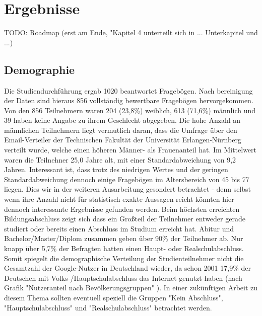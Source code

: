 %
% 

\chapter{Ergebnisse}

TODO: Roadmap (erst am Ende, "Kapitel 4 unterteilt sich in ... Unterkapitel und ...)

\section{Demographie}
Die Studiendurchführung ergab 1020 beantwortet Fragebögen. Nach bereinigung der Daten sind hieraus 856 vollständig bewertbare Fragebögen hervorgekommen.
Von den 856 Teilnehmern waren 204 (23,8\%) weiblich, 613 (71,6\%) männlich und 39 haben keine Angabe zu ihrem Geschlecht abgegeben. Die hohe Anzahl an männlichen Teilnehmern liegt vermutlich daran, dass die Umfrage über den Email-Verteiler der Technischen Fakultät der Universität Erlangen-Nürnberg verteilt wurde, welche einen höheren Männer- als Frauenanteil hat.
Im Mittelwert waren die Teilnehner 25,0 Jahre alt, mit einer Standardabweichung von 9,2 Jahren.
Interessant ist, dass trotz des niedrigen Wertes und der geringen Standardabweichung dennoch einige Fragebögen im Altersbereich von 45 bis 77 liegen. Dies wir in der weiteren Ausarbeitung gesondert betrachtet - denn selbst wenn ihre Anzahl nicht für statistisch exakte Aussagen reicht könnten hier dennoch interessante Ergebnisse gefunden werden.
Beim höchsten erreichten Bildungsabschluss zeigt sich dass ein Großteil der Teilnehmer entweder gerade studiert oder bereits einen Abschluss im Studium erreicht hat. Abitur und Bachelor/Master/Diplom zusammen geben über 90\% der Teilnehmer ab. Nur knapp über 5,7\% der Befragten hatten einen Haupt- oder Realschulabschluss.
Somit spiegelt die demographische Verteilung der Studienteilnehmer nicht die Gesamtzahl der Google-Nutzer in Deutschland wieder, da schon 2001 17,9\% der Deutschen mit Volks-/Hauptschulabschluss das Internet genutzt haben (nach Grafik "Nutzeranteil nach Bevölkerungsgruppen" \cite{ard2001internetusage}). In einer zukünftigen Arbeit zu diesem Thema sollten eventuell speziell die Gruppen "Kein Abschluss", "Hauptschulabschluss" und "Realschulabschluss" betrachtet werden.

